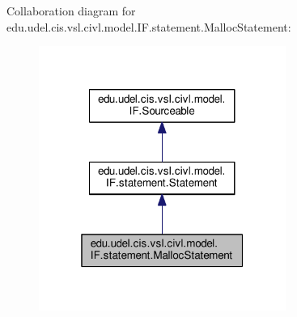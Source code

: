 Collaboration diagram for edu.\+udel.\+cis.\+vsl.\+civl.\+model.\+I\+F.\+statement.\+Malloc\+Statement\+:
\nopagebreak
\begin{figure}[H]
\begin{center}
\leavevmode
\includegraphics[width=229pt]{interfaceedu_1_1udel_1_1cis_1_1vsl_1_1civl_1_1model_1_1IF_1_1statement_1_1MallocStatement__coll__graph}
\end{center}
\end{figure}
